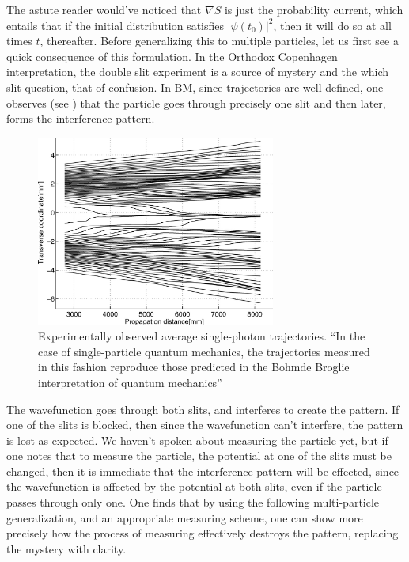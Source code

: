 The astute reader would've noticed that $\nabla S$ is just the probability
current, which entails that if the initial distribution satisfies
$\left|\psi(t_{0})\right|^{2}$, then it will do so at all times $t$,
thereafter. Before generalizing this to multiple particles, let us
first see a quick consequence of this formulation. In the Orthodox
Copenhagen interpretation, the double slit experiment is a source
of mystery and the which slit question, that of confusion. In BM,
since trajectories are well defined, one observes (see )
that the particle goes through precisely one slit and then later,
forms the interference pattern. 
\begin{figure}
\begin{centering}
\includegraphics[width=0.7\textwidth]{Chapter1/Figs/Raster/singlePhotonTrajectory}
\par\end{centering}

\caption{Experimentally observed average single-photon trajectories. ``In
the case of single-particle quantum mechanics, the trajectories measured
in this fashion reproduce those predicted in the Bohm\textendash de
Broglie interpretation of quantum mechanics'' \cite{Kocsis1170}\label{fig:Experimentally-observed-average}}


%
%
\end{figure}
The wavefunction goes through both slits, and interferes to create
the pattern. If one of the slits is blocked, then since the wavefunction
can't interfere, the pattern is lost as expected. We haven't spoken
about measuring the particle yet, but if one notes that to measure
the particle, the potential at one of the slits must be changed, then
it is immediate that the interference pattern will be effected, since
the wavefunction is affected by the potential at both slits, even
if the particle passes through only one. One finds that by using the
following multi-particle generalization, and an appropriate measuring
scheme, one can show more precisely how the process of measuring effectively
destroys the pattern, replacing the mystery with clarity.

